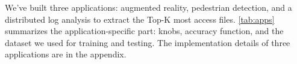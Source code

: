 




We've built three applications: augmented reality, pedestrian detection, and a
distributed log analysis to extract the Top-K most access
files. \autoref{tab:apps} summarizes the application-specific part: knobs,
accuracy function, and the dataset we used for training and testing. The
implementation details of three applications are in the appendix.


